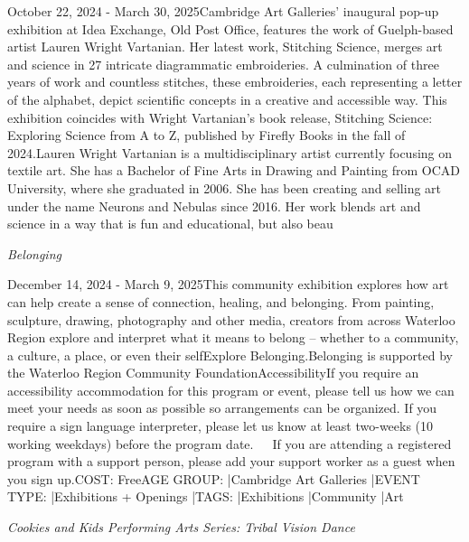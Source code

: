 \documentclass[letterpaper, 10pt]{article}
\newcommand{\subtitle}[1]{\textit{\large #1}\vspace{0.5em}}
\newcommand{\articlecontent}[1]{\small #1\vspace{1em}}
\begin{document}
\begin{multicols}{2}
{October 22, 2024 - March 30, 2025Cambridge Art Galleries' inaugural pop-up exhibition at Idea Exchange, Old Post Office, features the work of Guelph-based artist Lauren Wright Vartanian. Her latest work, Stitching Science, merges art and science in 27 intricate diagrammatic embroideries. A culmination of three years of work and countless stitches, these embroideries, each representing a letter of the alphabet, depict scientific concepts in a creative and accessible way. This exhibition coincides with Wright Vartanian’s book release, Stitching Science: Exploring Science from A to Z, published by Firefly Books in the fall of 2024.Lauren Wright Vartanian is a multidisciplinary artist currently focusing on textile art. She has a Bachelor of Fine Arts in Drawing and Painting from OCAD University, where she graduated in 2006. She has been creating and selling art under the name Neurons and Nebulas since 2016. Her work blends art and science in a way that is fun and educational, but also beau
}
\vspace{10px}

\subtitle{Belonging}

\articlecontent{

\qrcode[height=1.5cm]{https://ideaexchange.libnet.info/event/12094560}
\vspace{10px}

December 14, 2024 - March 9, 2025This community exhibition explores how art can help create a sense of connection, healing, and belonging. From painting, sculpture, drawing, photography and other media, creators from across Waterloo Region explore and interpret what it means to belong – whether to a community, a culture, a place, or even their selfExplore Belonging.Belonging is supported by the Waterloo Region Community FoundationAccessibilityIf you require an accessibility accommodation for this program or event, please tell us how we can meet your needs as soon as possible so arrangements can be organized. If you require a sign language interpreter, please let us know at least two-weeks (10 working weekdays) before the program date.   If you are attending a registered program with a support person, please add your support worker as a guest when you sign up.COST: FreeAGE GROUP: |Cambridge Art Galleries |EVENT TYPE: |Exhibitions + Openings |TAGS: |Exhibitions |Community |Art
}
\vspace{10px}

\subtitle{Cookies and Kids Performing Arts Series: Tribal Vision Dance}

\articlecontent{

}
\end{multicols}
\end{document}

